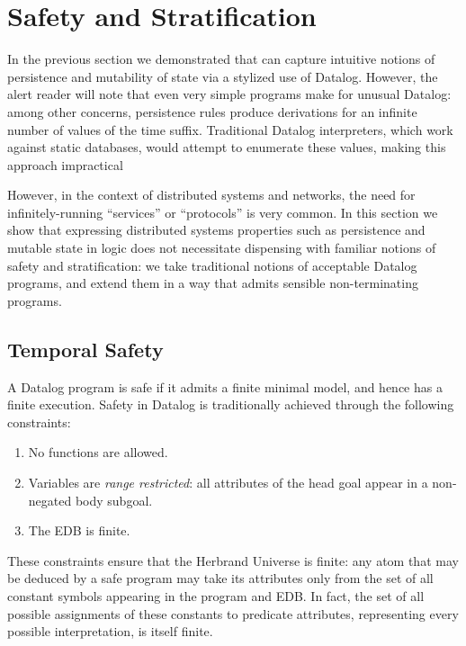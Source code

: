 \section{Safety and Stratification}

In the previous section we demonstrated that \slang can capture intuitive
notions of persistence and mutability of state via a stylized use of Datalog.
However, the alert reader will note that even very simple \slang programs make
for unusual Datalog: among other concerns, persistence rules produce
derivations for an infinite number of values of the time suffix.
Traditional Datalog interpreters, which work against static databases, would attempt to enumerate these values, 
making this approach impractical

However,
in the context of distributed systems and networks, the need for
infinitely-running ``services'' or ``protocols'' is very common.  In this
section we show that expressing distributed systems properties such as
persistence and mutable state in logic does not necessitate dispensing with
familiar notions of safety and stratification: we take traditional notions of
acceptable Datalog programs, and extend them in a way that admits sensible
non-terminating programs.

\subsection{Temporal Safety}
A Datalog program is safe if it admits a finite minimal model, and hence has
a finite execution.  Safety in Datalog is traditionally achieved
through the following constraints:

\begin{enumerate}
%
\item No functions are allowed.
%
\item Variables are \emph{range restricted}: all attributes of the head goal
appear in a non-negated body subgoal.
%
\item The EDB is finite.
%
\end{enumerate}

These constraints ensure that the Herbrand Universe is finite: any atom that
may be deduced by a safe program may take its attributes only from the 
set of all constant symbols appearing in the program and EDB.
In fact, the set of all possible assignments of these constants to predicate
attributes, representing every possible interpretation, is itself finite. 

